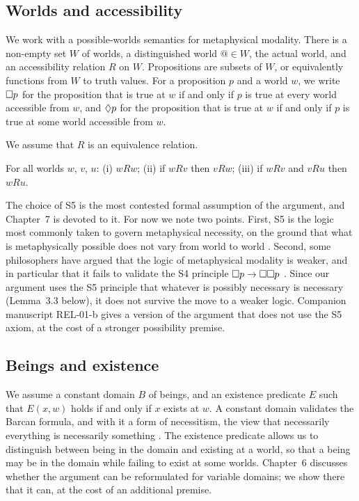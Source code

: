 \documentclass{situationist-preprint}
\begin{document}
\subsection{Worlds and accessibility}

We work with a possible-worlds semantics for metaphysical modality. There is a non-empty set $W$ of worlds, a distinguished world $@ \in W$, the actual world, and an accessibility relation $R$ on $W$. Propositions are subsets of $W$, or equivalently functions from $W$ to truth values. For a proposition $p$ and a world $w$, we write $\mathord{\Box} p$ for the proposition that is true at $w$ if and only if $p$ is true at every world accessible from $w$, and $\mathord{\Diamond} p$ for the proposition that is true at $w$ if and only if $p$ is true at some world accessible from $w$.

We assume that $R$ is an equivalence relation.

\begin{assumption}[S5]\label{a:s5}
For all worlds $w$, $v$, $u$: (i) $wRw$; (ii) if $wRv$ then $vRw$; (iii) if $wRv$ and $vRu$ then $wRu$.
\end{assumption}

The choice of S5 is the most contested formal assumption of the argument, and Chapter~7 is devoted to it. For now we note two points. First, S5 is the logic most commonly taken to govern metaphysical necessity, on the ground that what is metaphysically possible does not vary from world to world \citep{Williamson2013}. Second, some philosophers have argued that the logic of metaphysical modality is weaker, and in particular that it fails to validate the S4 principle $\mathord{\Box} p \to \mathord{\Box}\mathord{\Box} p$ \citep{Salmon1989}. Since our argument uses the S5 principle that whatever is possibly necessary is necessary (Lemma~3.3 below), it does not survive the move to a weaker logic. Companion manuscript REL-01-b gives a version of the argument that does not use the S5 axiom, at the cost of a stronger possibility premise.

\subsection{Beings and existence}

We assume a constant domain $B$ of beings, and an existence predicate $E$ such that $E(x, w)$ holds if and only if $x$ exists at $w$. A constant domain validates the Barcan formula, and with it a form of necessitism, the view that necessarily everything is necessarily something \citep{Williamson2013}. The existence predicate allows us to distinguish between being in the domain and existing at a world, so that a being may be in the domain while failing to exist at some worlds. Chapter~6 discusses whether the argument can be reformulated for variable domains; we show there that it can, at the cost of an additional premise.
\end{document}

